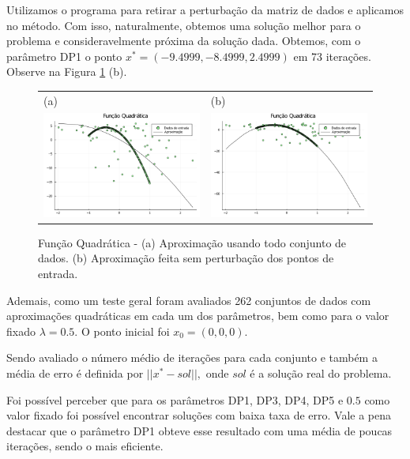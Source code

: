 \documentclass[12pt,a4paper]{article}
\begin{document}
	Utilizamos o programa para retirar a perturbação da matriz de dados e aplicamos no método. Com isso, naturalmente,  obtemos uma solução melhor para o problema e consideravelmente próxima da solução dada. Obtemos, com o parâmetro DP1 o ponto $x^* = (-9.4999, -8.4999, 2.4999)$ em 73 iterações. Observe na Figura \ref{fig1} (b).
	
		\begin{figure}[H]
		\centering 
		\begin{tabular}{ll}
			
			(a)& (b)   \\
			
			\includegraphics[width=0.45\linewidth]{1.png} & \includegraphics[width=0.45\linewidth]{2.png}\\ 
			
		\end{tabular}
		\caption{Função Quadrática - (a) Aproximação usando todo conjunto de dados. (b) Aproximação feita sem perturbação dos pontos de entrada.}
		\label{fig1}
	\end{figure}


	Ademais, como um teste geral foram avaliados 262 conjuntos de dados com aproximações quadráticas em cada um dos parâmetros, bem como para o valor fixado $\lambda = 0.5.$ O ponto inicial foi $x_0 = (0, 0, 0).$
	
	Sendo avaliado o número médio de iterações para cada conjunto e também a média de erro é definida por $||x^*-sol||,$ onde $sol$ é a solução real do problema.
	
	Foi possível perceber que para os parâmetros DP1, DP3, DP4, DP5 e $0.5$ como valor fixado foi possível encontrar soluções com baixa taxa de erro. Vale a pena destacar que o parâmetro DP1 obteve esse resultado com uma média de poucas iterações, sendo o mais eficiente.
	
\end{document}
